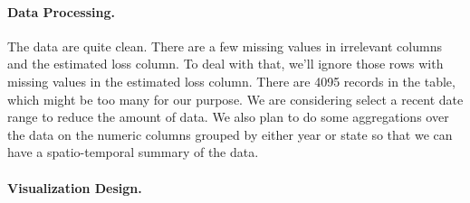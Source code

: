 \documentclass[11pt]{article}
\begin{document}
\paragraph{Data Processing.}
The data are quite clean. There are a few missing values in irrelevant columns
and the estimated loss column. To deal with that, we'll ignore those rows with
missing values in the estimated loss column. There are 4095 records in the
table, which might be too many for our purpose. We are considering select a
recent date range to reduce the amount of data. We also plan to do some
aggregations over the data on the numeric columns grouped by either year or
state so that we can have a spatio-temporal summary of the data.

\paragraph{Visualization Design.}
\end{document}

